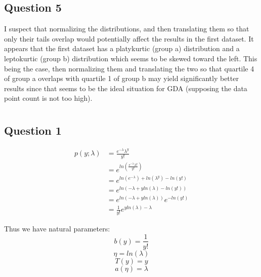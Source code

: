 \documentclass{article}
\begin{document}
\subsection{Question 5}

I suspect that normalizing the distributions, and then translating them so that 
only their tails overlap would potentially affect the results in the first 
dataset. 
It appears that the first dataset has a platykurtic (group a) distribution and
a leptokurtic (group b) distribution which seems to be skewed toward the left.
This being the case, then normalizing them and translating the two so that 
quartile 4 of group a overlaps with quartile 1 of group b may yield significantly
better results since that seems to be the ideal situation for GDA (supposing the
data point count is not too high).

\section{}
\subsection{Question 1}
\begin{center}
	\begin{align*}
		p(y; \lambda) &= \frac{e^{-\lambda}\lambda^y}{y!} \\
					  &= e^{
					  ln(
				  \frac{
			  e^{-\lambda}\lambda^y}{y!}
		  )} \\
		  &=  e ^{
			  ln(
			  e^{-\lambda}
			  )
			  + ln(\lambda^y)
			  - ln(y!)
		  } \\
			&= e^{ln(
				  -\lambda + yln(\lambda) - ln(y!))
			  }\\
			&= e^{
				ln(-\lambda + yln(\lambda))
			} e^{-ln(y!)}\\
			&= \frac{1}{y!}e^{yln(\lambda) - \lambda}
	\end{align*}
\end{center}
Thus we have natural parameters:
\[ b(y) = \frac{1}{y!} \]
\[ \eta = ln(\lambda) \]
\[ T(y) = y \]
\[ a(\eta) = \lambda \]
\subsection{}
\end{document}
